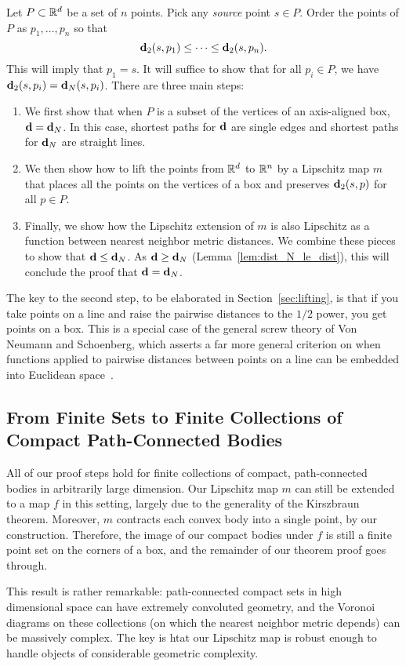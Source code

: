 \label{sec:the_proof}

  Let $P\subset \mathbb{R}^d$ be a set of $n$ points.
  Pick any \emph{source} point $s\in P$.
  Order the points of $P$ as $p_1,\ldots ,p_n$ so that
  \[
    \mathbf{d}_2(s,p_1) \le \cdots \le \mathbf{d}_2(s, p_n).
  \]
  This will imply that $p_1 = s$.
  It will suffice to show that for all $p_i\in P$, we have $\mathbf{d}_2(s,p_i) = \mathbf{d}_N(s,p_i)$.
  There are three main steps:
  \begin{enumerate}
    \item We first show that when $P$ is a subset of the vertices of an axis-aligned box, $\mathbf{d} = \mathbf{d}_N$.  In this case, shortest paths for $\mathbf{d}$ are single edges and shortest paths for $\mathbf{d}_N$ are straight lines.
    \item We then show how to lift the points from $\mathbb{R}^d$ to $\mathbb{R}^n$ by a Lipschitz map $m$ that places all the points on the vertices of a box and preserves $\mathbf{d}_2(s,p)$ for all $p\in P$.
    \item Finally, we show how the Lipschitz extension of $m$ is also Lipschitz as a function between nearest neighbor metric distances.  We combine these pieces to show that $\mathbf{d} \le \mathbf{d}_N$.  As $\mathbf{d} \ge \mathbf{d}_N$ (Lemma~\ref{lem:dist_N_le_dist}), this will conclude the proof that $\mathbf{d} = \mathbf{d}_N$.
  \end{enumerate}
The key to the second step, to be elaborated in Section~\ref{sec:lifting},
is that if you take points on a line and raise the pairwise distances to
the $1/2$ power, you get points on a box. This is a special case of the
general screw theory of Von Neumann and Schoenberg, which asserts a far
more general criterion on when functions applied to pairwise distances
between points on a line can be embedded into Euclidean
space~\cite{VonNeumann41}.
  
  
  
\subsection{From Finite Sets to Finite Collections of Compact Path-Connected Bodies}
\label{sec:bodies}
All of our proof steps hold for finite collections of compact,
path-connected bodies in arbitrarily large dimension. Our Lipschitz map $m$ can
still be extended to a map $f$ in this setting, largely due to the
generality of the Kirszbraun theorem. Moreover, $m$ contracts each convex
body into a single point, by our construction. Therefore, the image of our
compact bodies under $f$ is still a finite point set on the corners of a
box, and the remainder of our theorem proof goes through.

This result is rather remarkable: path-connected compact sets in high
dimensional space can have extremely convoluted geometry, and the Voronoi diagrams
on these collections (on which the nearest neighbor metric depends) can be
massively complex.  The key is htat our Lipschitz map is robust enough to
handle objects of considerable geometric complexity.
  
  
